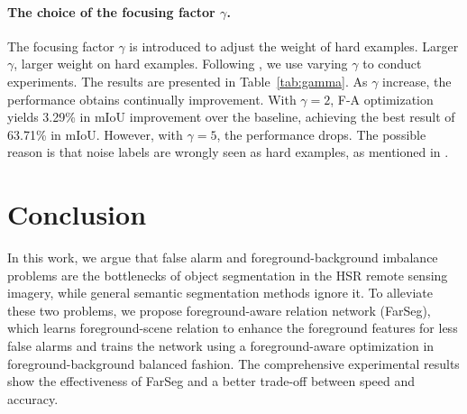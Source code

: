 \documentclass[10pt,twocolumn,letterpaper]{article}
\begin{document}
\paragraph{The choice of the focusing factor $\gamma$.}
The focusing factor $\gamma$ is introduced to adjust the weight of hard examples.
Larger $\gamma$, larger weight on hard examples.
Following \cite{lin2017focal}, we use varying $\gamma$ to conduct experiments.
The results are presented in Table~\ref{tab:gamma}.
As $\gamma$ increase, the performance obtains continually improvement.
With $\gamma=2$, F-A optimization yields 3.29\% in mIoU improvement over the baseline, achieving the best result of 63.71\% in mIoU.
However, with $\gamma=5$, the performance drops.
The possible reason is that noise labels are wrongly seen as hard examples, as mentioned in \cite{li2019gradient}.

\begin{table}[]
   \caption{mIoU (\%) on iSAID $val$ set using varying $\gamma$ for F-A optimization.
      \label{tab:gamma}}
   \centering
   \renewcommand{\arraystretch}{1.4}
\end{table}




\section{Conclusion}
\label{sec:conc}
In this work, we argue that false alarm and foreground-background imbalance problems are the bottlenecks of object segmentation in the HSR remote sensing imagery, while general semantic segmentation methods ignore it.
To alleviate these two problems, we propose foreground-aware relation network (FarSeg), which learns foreground-scene relation to enhance the foreground features for less false alarms and trains the network using a foreground-aware optimization in foreground-background balanced fashion.
The comprehensive experimental results show the effectiveness of FarSeg and a better trade-off between speed and accuracy.


{\small
   
   
}
\end{document}
